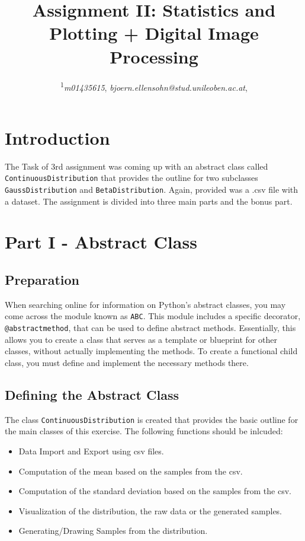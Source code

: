 \documentclass{CPSReport}
\title{Assignment II: Statistics and Plotting + Digital Image Processing} %
\author{
	\coursetitle{Introduction to Machine Learning Lab (190.013), SS2023}
	\authorstyle{Björn Ellensohn\textsuperscript{1}} %
	\newline\newline %
	\textsuperscript{1}\textit{m01435615}, \textit{bjoern.ellensohn@stud.unileoben.ac.at}, \institution{Montanuniversität Leoben, Austria}\\ %
	\submissiondate{\today} %
}
\begin{document}
\maketitle %

\thispagestyle{firstpage} %



\section{Introduction}
The Task of 3rd assignment was coming up with an abstract class called \texttt{ContinuousDistribution} that provides the outline for two subclasses \texttt{GaussDistribution} and \texttt{BetaDistribution}.
Again, provided was a .csv file with a dataset.
The assignment is divided into three main parts and the bonus part.

\section{Part I - Abstract Class}
\subsection{Preparation}
When searching online for information on Python's abstract classes, you may come across the module known as \texttt{ABC}. This module includes a specific decorator, \texttt{@abstractmethod}, that can be used to define abstract methods. Essentially, this allows you to create a class that serves as a template or blueprint for other classes, without actually implementing the methods. To create a functional child class, you must define and implement the necessary methods there.

\subsection{Defining the Abstract Class}
The class \texttt{ContinuousDistribution} is created that provides the basic outline for the main classes of this exercise. The following functions should be inlcuded:
\begin{itemize}
    \item Data Import and Export using csv files.
    \item Computation of the mean based on the samples from the csv.
    \item Computation of the standard deviation based on the samples from the csv.
    \item Visualization of the distribution, the raw data or the generated samples.
    \item Generating/Drawing Samples from the distribution. 
\end{itemize}
\end{document}
